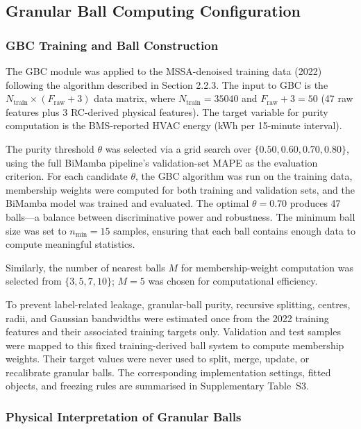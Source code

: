 \documentclass[11pt]{article}
\begin{document}
\subsection{Granular Ball Computing Configuration}

\subsubsection{GBC Training and Ball Construction}

The GBC module was applied to the MSSA-denoised training data (2022) following the algorithm described in Section 2.2.3. The input to GBC is the $N_{\text{train}} \times (F_{\text{raw}}+3)$ data matrix, where $N_{\text{train}}=35040$ and $F_{\text{raw}}+3=50$ (47 raw features plus 3 RC-derived physical features). The target variable for purity computation is the BMS-reported HVAC energy (kWh per 15-minute interval).

The purity threshold $\theta$ was selected via a grid search over $\{0.50,0.60,0.70,0.80\}$, using the full BiMamba pipeline's validation-set MAPE as the evaluation criterion. For each candidate $\theta$, the GBC algorithm was run on the training data, membership weights were computed for both training and validation sets, and the BiMamba model was trained and evaluated. The optimal $\theta=0.70$ produces 47 balls—a balance between discriminative power and robustness. The minimum ball size was set to $n_{\text{min}}=15$ samples, ensuring that each ball contains enough data to compute meaningful statistics.

Similarly, the number of nearest balls $M$ for membership-weight computation was selected from $\{3,5,7,10\}$; $M=5$ was chosen for computational efficiency.

To prevent label-related leakage, granular-ball purity, recursive splitting, centres, radii, and Gaussian bandwidths were estimated once from the 2022 training features and their associated training targets only. Validation and test samples were mapped to this fixed training-derived ball system to compute membership weights. Their target values were never used to split, merge, update, or recalibrate granular balls. The corresponding implementation settings, fitted objects, and freezing rules are summarised in Supplementary Table~S3.

\subsubsection{Physical Interpretation of Granular Balls}
\end{document}
